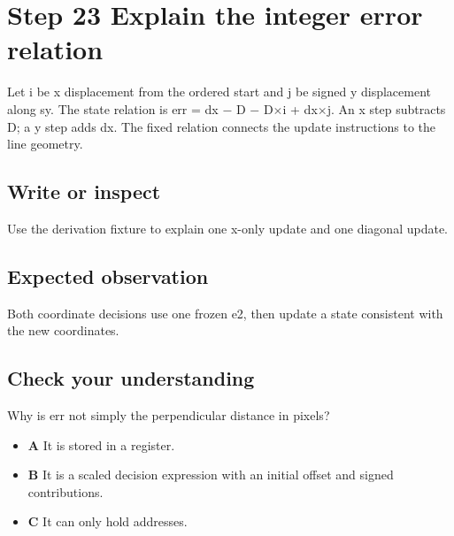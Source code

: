\section{Step 23 Explain the integer error
  relation}\label{007-bresenham-line-s23-step-23-explain-the-integer-error-relation}

Let i be x displacement from the ordered start and j be signed y
displacement along sy. The state relation is err = dx \ensuremath{-} D \ensuremath{-} D\ensuremath{\times}i + dx\ensuremath{\times}j.
An x step subtracts D; a y step adds dx. The fixed relation connects the
update instructions to the line geometry.

\subsection{Write or
  inspect}\label{007-bresenham-line-s23-write-or-inspect}

Use the derivation fixture to explain one x-only update and one diagonal
update.

\subsection{Expected
  observation}\label{007-bresenham-line-s23-expected-observation}

Both coordinate decisions use one frozen e2, then update a state
consistent with the new coordinates.

\subsection{Check your
  understanding}\label{007-bresenham-line-s23-check-your-understanding}

Why is err not simply the perpendicular distance in pixels?

\begin{itemize}
  \tightlist
  \item
        \textbf{A} It is stored in a register.
  \item
        \textbf{B} It is a scaled decision expression with an initial offset
        and signed contributions.
  \item
        \textbf{C} It can only hold addresses.
\end{itemize}
